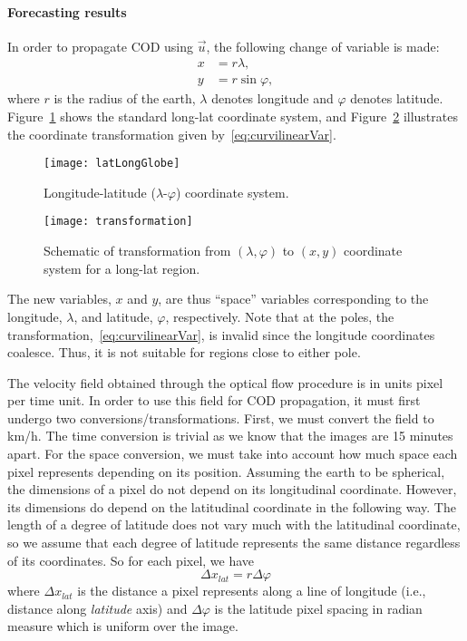 \documentclass[onecolumn, 12pt, conference]{ieeeconf}
\renewcommand{\u}{\vec{u}}
\begin{document}
\paragraph{Forecasting results}
In order to propagate COD using $\u$, the following change of variable is made:
\begin{equation}
\label{eq:curvilinearVar}
\begin{split}
x &= r \lambda, \\
y &= r \sin \varphi,
\end{split}
\end{equation}
where $r$ is the radius of the earth, $\lambda$ denotes longitude and $\varphi$ denotes latitude. Figure~\ref{fig:latLongGlobe} shows the standard long-lat coordinate system, and Figure~\ref{fig:transformation} illustrates the coordinate transformation given by~\eqref{eq:curvilinearVar}.
\begin{figure}[!ht]
  	\centering
    	\texttt{[image: latLongGlobe]}
	\caption{Longitude-latitude ($\lambda$-$\varphi$) coordinate system.}
	\label{fig:latLongGlobe}
\end{figure}
\begin{figure}[!ht]
  	\centering
    	\texttt{[image: transformation]}
	\caption{Schematic of transformation from $(\lambda,\varphi)$ to $(x,y)$ coordinate system for a long-lat region.}
	\label{fig:transformation}
\end{figure}
The new variables, $x$ and $y$, are thus ``space'' variables corresponding to the longitude, $\lambda$, and latitude, $\varphi$, respectively. Note that at the poles, the transformation,~\eqref{eq:curvilinearVar}, is invalid since the longitude coordinates coalesce. Thus, it is not suitable for regions close to either pole.

The velocity field obtained through the optical flow procedure is in units pixel per time unit. In order to use this field for COD propagation, it must first undergo two conversions/transformations. First, we must convert the field to km/h. The time conversion is trivial as we know that the images are 15 minutes apart. For the space conversion, we must take into account how much space each pixel represents depending on its position. Assuming the earth to be spherical, the dimensions of a pixel do not depend on its longitudinal coordinate. However, its dimensions do depend on the latitudinal coordinate in the following way. The length of a degree of latitude does not vary much with the latitudinal coordinate, so we assume that each degree of latitude represents the same distance regardless of its coordinates. So for each pixel, we have
\begin{equation}
\label{eq:latLength}
\Delta x_{lat} = r\Delta \varphi
\end{equation}
where $\Delta x_{lat}$ is the distance a pixel represents along a line of longitude (i.e., distance along \emph{latitude} axis) and $\Delta \varphi$ is the latitude pixel spacing in radian measure which is uniform over the image.
\end{document}
